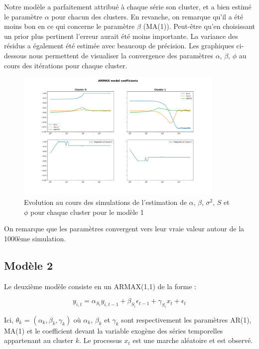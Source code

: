 Notre modèle a parfaitement attribué à chaque série son cluster, et a bien estimé le paramètre $\alpha$ pour chacun des clusters. En revanche, on remarque qu'il a été moins bon en ce qui concerne le paramètre $\beta$ (MA(1)). Peut-être qu'en choisissant un prior plus pertinent l'erreur aurait été moins importante. La variance des résidus a également été estimée avec beaucoup de précision.
\newline
Les graphiques ci-dessous nous permettent de visualiser la convergence des paramètres $\alpha$, $\beta$, $\phi$ au cours des itérations pour chaque cluster.
\newpage
\begin{figure}[h]
    \centering
    \includegraphics[width=10cm]{images/model1_graph.pdf}
    \caption{Evolution au cours des simulations de l'estimation de $\alpha$, $\beta$, $\sigma^2$, $S$ et $\phi$ pour chaque cluster pour le modèle 1}
\end{figure}
\newline 
On remarque que les paramètres convergent vers leur vraie valeur autour de la 1000ème simulation.

\subsection{Modèle 2}

Le deuxième modèle consiste en un ARMAX(1,1) de la forme : 

\begin{equation*}
y_{i,t} = \alpha_{S_i}y_{i,t-1} + \beta_{S_i}\epsilon_{t-1} + \gamma_{S_i}x_t + \epsilon_t
\end{equation*}

Ici, $\theta_k$ = $(\alpha_k,\beta_k,\gamma_k)$ où $\alpha_k$, $\beta_k$ et $\gamma_k$ sont respectivement les paramètres AR(1), MA(1) et le coefficient devant la variable exogène des séries temporelles appartenant au cluster $k$. Le processus $x_t$ est une marche aléatoire et est observé.


